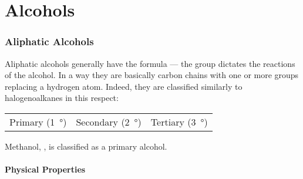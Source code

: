 

\pagebreak
\hypertarget{ChapterAlcohols}{}
\part{Alcohols}

	\section{Aliphatic Alcohols}
		Aliphatic alcohols generally have the formula  --- the  group dictates the reactions of the alcohol. In a way they
		are basically carbon chains with one or more  groups replacing a hydrogen atom. Indeed, they are classified similarly to
		halogenoalkanes in this respect:

		\begin{center}\begin{table}[ht]\renewcommand{\arraystretch}{1.4}
		\begin{tabu} to \textwidth {| X[c,m] | X[c,m] | X[c,m] |}

			\hline
			\vspace{2mm}					\vspace{2mm}	&
			\vspace{2mm}			\vspace{2mm}	&
			\vspace{2mm}		\vspace{2mm}	\\

			\hline
			Primary (\SI{1}{\degree})		&
			Secondary (\SI{2}{\degree})		&
			Tertiary (\SI{3}{\degree})		\\
			\hline

		\end{tabu}
		\end{table}\end{center}\vspace{-10mm}

		Methanol, , is classified as a primary alcohol.

		\subsection{Physical Properties}

